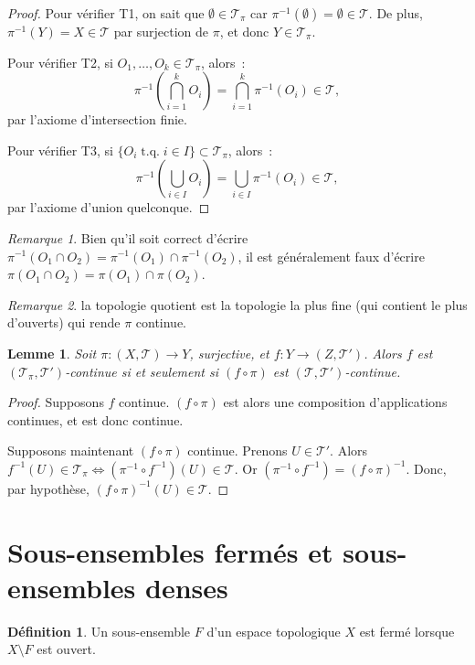 \documentclass{report}
\newtheorem{lem}[thm]{Lemme}
\theoremstyle{definition}
\newtheorem{déf}[thm]{Définition}
\theoremstyle{remark}
\newtheorem*{rmq}{Remarque}
\DeclareMathOperator{\tq}{\text{ t.q. }}
\renewcommand{\top}{\mathcal T}
\begin{document}
		\begin{proof} Pour vérifier T1, on sait que $\emptyset \in \top_\pi$ car $\pi^{-1}(\emptyset) = \emptyset \in \top$. De plus, $\pi^{-1}(Y) = X \in \top$
		par surjection de $\pi$, et donc $Y \in \top_\pi$.

		Pour vérifier T2, si $O_1, \ldots, O_k \in \top_\pi$, alors~:
		\[\pi^{-1}\left(\bigcap_{i=1}^kO_i\right) = \bigcap_{i=1}^k\pi^{-1}(O_i) \in \top,\]
		par l'axiome d'intersection finie.

		Pour vérifier T3, si $\{O_i \tq i \in I\} \subset \top_\pi$, alors~:
		\[\pi^{-1}\left(\bigcup_{i \in I}O_i\right) = \bigcup_{i \in I}\pi^{-1}(O_i) \in \top,\]
		par l'axiome d'union quelconque.
		\end{proof}

		\begin{rmq} Bien qu'il soit correct d'écrire $\pi^{-1}(O_1 \cap O_2) = \pi^{-1}(O_1) \cap \pi^{-1}(O_2)$, il est généralement faux d'écrire
		$\pi(O_1 \cap O_2) = \pi(O_1) \cap \pi(O_2)$.
		\end{rmq}

		\begin{rmq} la topologie quotient est la topologie la plus fine (qui contient le plus d'ouverts) qui rende $\pi$ continue.
		\end{rmq}

		\begin{lem} Soit $\pi : (X, \top) \to Y$, surjective, et $f : Y \to (Z, \top')$. Alors $f$ est $(\top_\pi, \top')$-continue si et seulement si
		$(f \circ \pi)$ est $(\top, \top')$-continue.
		\end{lem}

		\begin{proof} Supposons $f$ continue. $(f \circ \pi)$ est alors une composition d'applications continues, et est donc continue.

		Supposons maintenant $(f \circ \pi)$ continue. Prenons $U \in \top'$. Alors $f^{-1}(U) \in \top_\pi \iff (\pi^{-1} \circ f^{-1})(U) \in \top$.
		Or $(\pi^{-1} \circ f^{-1}) = (f \circ \pi)^{-1}$. Donc, par hypothèse, $(f \circ \pi)^{-1}(U) \in \top$.
		\end{proof}

	\section{Sous-ensembles fermés et sous-ensembles denses}
		\begin{déf} Un sous-ensemble $F$ d'un espace topologique $X$ est fermé lorsque $X \setminus F$ est ouvert.
		\end{déf}
\end{document}

